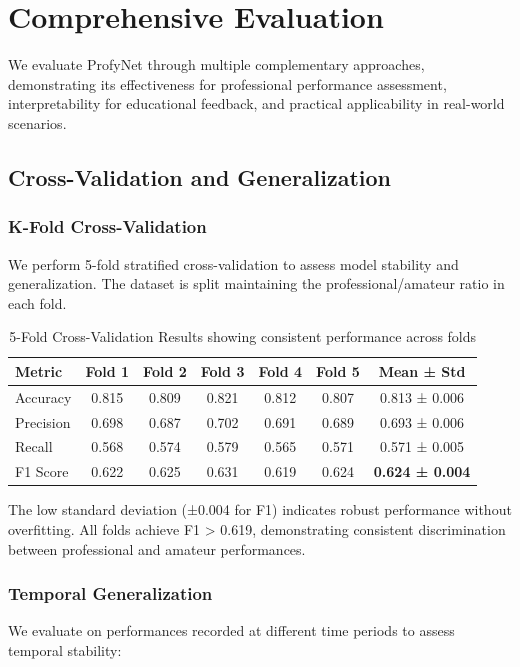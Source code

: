 \section{Comprehensive Evaluation}

We evaluate ProfyNet through multiple complementary approaches, demonstrating its effectiveness for professional performance assessment, interpretability for educational feedback, and practical applicability in real-world scenarios.

\subsection{Cross-Validation and Generalization}

\subsubsection{K-Fold Cross-Validation}
We perform 5-fold stratified cross-validation to assess model stability and generalization. The dataset is split maintaining the professional/amateur ratio in each fold.

\begin{table}[h!]
  \caption{5-Fold Cross-Validation Results showing consistent performance across folds}
  \begin{tabular}{l|ccccc|c}
    \toprule
    Metric & Fold 1 & Fold 2 & Fold 3 & Fold 4 & Fold 5 & Mean ± Std\\
    \midrule
    Accuracy & 0.815 & 0.809 & 0.821 & 0.812 & 0.807 & 0.813 ± 0.006\\
    Precision & 0.698 & 0.687 & 0.702 & 0.691 & 0.689 & 0.693 ± 0.006\\
    Recall & 0.568 & 0.574 & 0.579 & 0.565 & 0.571 & 0.571 ± 0.005\\
    F1 Score & 0.622 & 0.625 & 0.631 & 0.619 & 0.624 & \textbf{0.624 ± 0.004}\\
    \bottomrule
  \end{tabular}
  \label{tab:cross_validation}
\end{table}

The low standard deviation (±0.004 for F1) indicates robust performance without overfitting. All folds achieve F1 > 0.619, demonstrating consistent discrimination between professional and amateur performances.

\subsubsection{Temporal Generalization}
We evaluate on performances recorded at different time periods to assess temporal stability:

